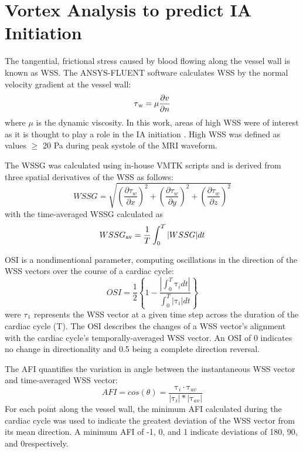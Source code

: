 \cleartooddpage[\thispagestyle{empty}]
\chapter{Vortex Analysis to predict IA Initiation}\label{CHAPTER3}

The tangential, frictional stress caused by blood flowing along the vessel wall is known as WSS. The ANSYS-FLUENT software calculates WSS by the normal velocity gradient at the vessel wall:
	\begin{equation}
\tau\textsubscript{w} = \mu\frac{\partial v}{\partial n}
	\end{equation}
where $\mu$ is the dynamic viscosity. In this work, areas of high WSS were of interest as it is thought to play a role in the IA initiation \cite{Meng1254}. High WSS was defined as values $\ge$ 20 Pa during peak systole of the MRI waveform.

The WSSG was calculated using in-house VMTK scripts and is derived from three spatial derivatives of the WSS as follows:
	\begin{equation}
WSSG = \sqrt{(\frac{\partial{\tau_{w}}}{\partial{x}})^2 + (\frac{\partial{\tau_{w}}}{\partial{y}})^2 + (\frac{\partial{\tau_{w}}}{\partial{z}})^2}
	\end{equation}
with the time-averaged WSSG calculated as
	\begin{equation}
WSSG\textsubscript{av} = \frac{1}{T}\int_{0}^{T} | WSSG | dt
	\end{equation}
	
OSI is a nondimentional parameter, computing oscillations in the direction of the WSS vectors over the course of a cardiac cycle:
	\begin{equation}
OSI=\frac{1}{2}\left\{1-\frac{| \int_{0}^{T} \mathrm{\tau}_{i}dt |}{\int_{0}^{T} | \mathrm{\tau}_{i} | dt}\right\}
	\end{equation}
were $\tau\textsubscript{i}$ represents the WSS vector at a given time step across the duration of the cardiac cycle (T). The OSI describes the changes of a WSS vector's alignment with the cardiac cycle's temporally-averaged WSS vector. An OSI of 0 indicates no change in directionality and 0.5 being a complete direction reversal. 

The AFI \cite{Mantha1113} quantifies the variation in angle between the instantaneous WSS vector and time-averaged WSS vector:
	\begin{equation}
AFI=cos(\theta)=\frac{\mathrm{\tau}_{i}\cdot \mathrm{\tau}_{av}}{| \mathrm{\tau}_{i} |*| \mathrm{\tau}_{av}|}
	\end{equation}
For each point along the vessel wall, the minimum AFI calculated during the cardiac cycle was used to indicate the greatest deviation of the WSS vector from its mean direction. A minimum AFI of -1, 0, and 1 indicate deviations of 180\textdegree, 90\textdegree, and 0\textdegree respectively.

